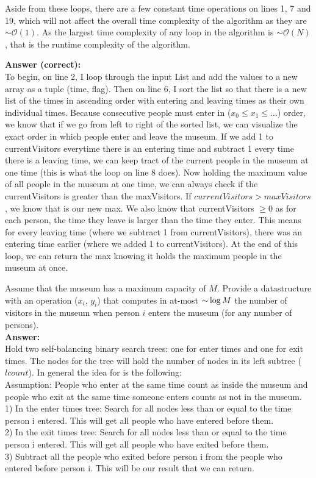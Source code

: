 \begin{problem}
\begin{questions}
Aside from these loops, there are a few constant time operations on lines 1, 7 and 19, which will not affect the overall time complexity of the algorithm as they are $\sim \mathcal{O}(1)$. As the largest time complexity of any loop in the algorithm is $\sim \mathcal{O}(N)$, that is the runtime complexity of the algorithm.

\textbf{Answer (correct):}\\
To begin, on line 2, I loop through the input List and add the values to a new array as a tuple (time, flag). Then on line 6, I sort the list so that there is a new list of the times in ascending order with entering and leaving times as their own individual times. Because consecutive people must enter in ($x_0 \leq x_1 \leq \dots$) order, we know that if we go from left to right of the sorted list, we can visualize the exact order in which people enter and leave the museum. If we add 1 to currentVisitors everytime there is an entering time and subtract 1 every time there is a leaving time, we can keep tract of the current people in the museum at one time (this is what the loop on line 8 does). Now holding the maximum value of all people in the museum at one time, we can always check if the currentVisitors is greater than the maxVisitors. If $currentVisitors > maxVisitors$, we know that is our new max. We also know that currentVisitors $\geq 0$ as for each person, the time they leave is larger than the time they enter. This means for every leaving time (where we subtract 1 from currentVisitors), there was an entering time earlier (where we added 1 to currentVisitors). At the end of this loop, we can return the max knowing it holds the maximum people in the museum at once.

\item Assume that the museum has a maximum capacity of $M$. Provide a datastructure with an operation ($x_i$, $y_i$) that computes in at-most $\mathord{\sim}\log M$ the number of visitors in the museum when person $i$ enters the museum (for any number of persons).\\
\textbf{Answer:}\\
Hold two self-balancing binary search trees: one for enter times and one for exit times. The nodes for the tree will hold the number of nodes in its left subtree ($lcount$). In general the idea for  is the following:\\
Assumption: People who enter at the same time count as inside the museum and people who exit at the same time someone enters counts as not in the museum.\\
1) In the enter times tree: Search for all nodes less than or equal to the time person i entered. This will get all people who have entered before them.\\
2) In the exit times tree: Search for all nodes less than or equal to the time person i entered. This will get all people who have exited before them.\\
3) Subtract all the people who exited before person i from the people who entered before person i. This will be our result that we can return.


\end{questions}
\end{problem}
